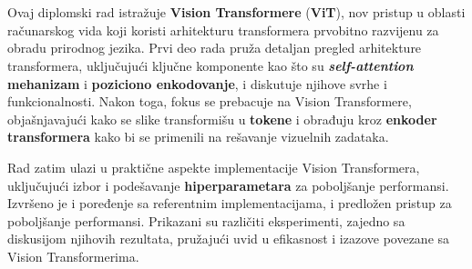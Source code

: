 \documentclass[12pt]{article}
\begin{document}
   \newpage
   
   \renewcommand{\contentsname}{Sadržaj}
   \tableofcontents
   \thispagestyle{empty} %

   \restoregeometry %
   \newpage
   
   \thispagestyle{empty} %

   \newcommand{\specialsection}[1]{
      \section*{\centering{#1}} %
   }

   \vspace*{0.5in}
   \specialsection{Apstrakt}
   

   \vspace*{0.5in}

   Ovaj diplomski rad istražuje \textbf{Vision Transformere} (\textbf{ViT}),
   nov pristup u oblasti računarskog vida koji koristi arhitekturu
   transformera prvobitno razvijenu za obradu prirodnog jezika. Prvi deo rada pruža detaljan pregled arhitekture transformera, 
   uključujući ključne komponente kao što su \textbf{\textit{self-attention} mehanizam} i \textbf{poziciono enkodovanje},
   i diskutuje njihove svrhe i funkcionalnosti. Nakon toga, fokus se prebacuje
   na Vision Transformere, objašnjavajući kako se slike transformišu
   u \textbf{tokene} i obrađuju kroz \textbf{enkoder transformera} kako bi se primenili na rešavanje vizuelnih zadataka.

   Rad zatim ulazi u praktične aspekte implementacije Vision Transformera,
   uključujući izbor i podešavanje \textbf{hiperparametara} za poboljšanje performansi.
   Izvršeno je i poređenje sa referentnim implementacijama, i predložen pristup za 
   poboljšanje performansi. Prikazani su različiti
   eksperimenti, zajedno sa diskusijom njihovih rezultata, pružajući uvid
   u efikasnost i izazove povezane sa Vision Transformerima.


   \newpage
   \setcounter{page}{1}
\end{document}
